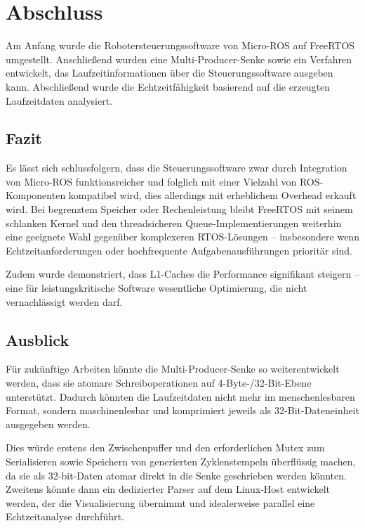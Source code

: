 \section{Abschluss}

Am Anfang wurde die Robotersteuerungssoftware von Micro-ROS auf FreeRTOS
umgestellt. Anschließend wurden eine Multi-Producer-Senke sowie ein Verfahren
entwickelt, das Laufzeitinformationen über die Steuerungssoftware ausgeben kann.
Abschließend wurde die Echtzeitfähigkeit basierend auf die erzeugten
Laufzeitdaten analysiert.

\subsection{Fazit}

Es lässt sich schlussfolgern, dass die Steuerungssoftware zwar durch Integration
von Micro-ROS funktionsreicher und folglich mit einer Vielzahl von
ROS-Komponenten kompatibel wird, dies allerdings mit erheblichem Overhead
erkauft wird. Bei begrenztem Speicher oder Rechenleistung bleibt FreeRTOS mit
seinem schlanken Kernel und den threadsicheren Queue-Implementierungen weiterhin
eine geeignete Wahl gegenüber komplexeren RTOS-Lösungen -- insbesondere wenn
Echtzeitanforderungen oder hochfrequente Aufgabenausführungen prioritär sind.

Zudem wurde demonstriert, dass L1-Caches die Performance signifikant steigern --
eine für leistungskritische Software wesentliche Optimierung, die nicht
vernachlässigt werden darf.

\subsection{Ausblick}

Für zukünftige Arbeiten könnte die Multi-Producer-Senke so weiterentwickelt
werden, dass sie atomare Schreiboperationen auf 4-Byte-/32-Bit-Ebene
unterstützt. Dadurch könnten die Laufzeitdaten nicht mehr im menschenlesbaren
Format, sondern maschinenlesbar und komprimiert jeweils als 32-Bit-Dateneinheit
ausgegeben werden.

Dies würde erstens den Zwischenpuffer und den erforderlichen Mutex zum
Serialisieren sowie Speichern von generierten Zyklenstempeln überflüssig machen,
da sie als 32-bit-Daten atomar direkt in die Senke geschrieben werden könnten.
Zweitens könnte dann ein dedizierter Parser auf dem Linux-Host entwickelt
werden, der die Visualisierung übernimmt und idealerweise parallel eine
Echtzeitanalyse durchführt.

